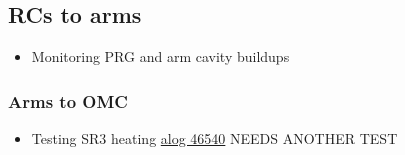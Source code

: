 
\subsection{RCs to arms}
\begin{itemize}
	\item Monitoring PRG and arm cavity buildups
\end{itemize}


\subsubsection{Arms to OMC}
\begin{itemize}
    \item Testing SR3 heating
        \subitem \href{https://alog.ligo-wa.caltech.edu/aLOG/index.php?callRep=46540}{alog 46540}
        \subitem NEEDS ANOTHER TEST
\end{itemize}